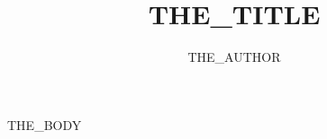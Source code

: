 \documentclass[]{article}
\title{THE_TITLE}
\author{THE_AUTHOR}
\begin{document}
\maketitle

THE_BODY
\end{document}

